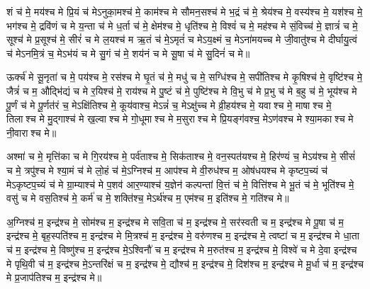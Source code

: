 शं च॑ मे॒ मय॑श्च मे प्रि॒यं च॑ मेऽनुका॒मश्च॑ मे॒ काम॑श्च मे सौमन॒सश्च॑ मे भ॒द्रं च॑ मे॒ श्रेय॑श्च मे॒ वस्य॑श्च मे॒ यश॑श्च मे॒ भग॑श्च मे॒ द्रवि॑णं च मे य॒न्ता च॑ मे ध॒र्ता च॑ मे॒ क्षेम॑श्च मे॒ धृति॑श्च मे॒ विश्वं॑ च मे॒ मह॑श्च मे सं॒विच्च॑ मे॒ ज्ञात्रं॑ च मे॒ सूश्च॑ मे प्र॒सूश्च॑ मे॒ सीरं॑ च मे ल॒यश्च॑ म ऋ॒तं च॑ मे॒ऽमृतं॑ च मेऽय॒क्ष्मं च॒ मेऽना॑मयच्च मे जी॒वातु॑श्च मे दीर्घायु॒त्वं च॑ मेऽनमि॒त्रं च॒ मेऽभ॑यं च मे सु॒गं च॑ मे॒ शय॑नं च मे सू॒षा च॑ मे सु॒दिनं॑ च मे॥


ऊर्क्च॑ मे सू॒नृता॑ च मे॒ पय॑श्च मे॒ रस॑श्च मे घृ॒तं च॑ मे॒ मधु॑ च मे॒ सग्धि॑श्च मे॒ सपी॑तिश्च मे कृ॒षिश्च॑ मे॒ वृष्टि॑श्च मे॒ जैत्रं॑ च म॒ औद्भि॑द्यं च मे र॒यिश्च॑ मे॒ राय॑श्च मे पु॒ष्टं च॑ मे॒ पुष्टि॑श्च मे वि॒भु च॑ मे प्र॒भु च॑ मे ब॒हु च॑ मे॒ भूय॑श्च मे पू॒र्णं च॑ मे पू॒र्णत॑रं च॒ मेऽक्षि॑तिश्च मे॒ कूय॑वाश्च॒ मेऽन्नं॑ च॒ मेऽक्षु॑च्च मे व्री॒हय॑श्च मे॒ यवाश्च मे॒ माषाश्च मे॒ तिलाश्च मे मु॒द्गाश्च॑ मे ख॒ल्वाश्च मे गो॒धूमाश्च मे म॒सुराश्च मे प्रि॒यङ्ग॑वश्च॒ मेऽण॑वश्च मे श्या॒मकाश्च मे नी॒वाराश्च मे॥ 


अश्मा॑ च मे॒ मृत्ति॑का च मे गि॒रय॑श्च मे॒ पर्व॑ताश्च मे॒ सिक॑ताश्च मे॒ वन॒स्पत॑यश्च मे॒ हिर॑ण्यं च॒ मेऽय॑श्च मे॒ सीसं॑ च मे॒ त्रपु॑श्च मे श्या॒मं च॑ मे लो॒हं च॑ मे॒ऽग्निश्च॑ म॒ आप॑श्च मे वी॒रुध॑श्च म॒ ओष॑धयश्च मे कृष्टप॒च्यं च॑ मेऽकृष्टप॒च्यं च॑ मे ग्रा॒म्याश्च॑ मे प॒शव॑ आर॒ण्याश्च॑ य॒ज्ञेन॑ कल्पन्तां वि॒त्तं च॑ मे॒ वित्ति॑श्च मे भू॒तं च॑ मे॒ भूति॑श्च मे॒ वसु॑ च मे वस॒तिश्च॑ मे॒ कर्म॑ च मे॒ शक्ति॑श्च॒ मेऽर्थ॑श्च म॒ एम॑श्च म॒ इति॑श्च मे॒ गति॑श्च मे॥


अ॒ग्निश्च॑ म॒ इन्द्र॑श्च मे॒ सोम॑श्च म॒ इन्द्र॑श्च मे सवि॒ता च॑ म॒ इन्द्र॑श्च मे॒ सर॑स्वती च म॒ इन्द्र॑श्च मे पू॒षा च॑ म॒ इन्द्र॑श्च मे॒ बृह॒स्पति॑श्च म॒ इन्द्र॑श्च मे मि॒त्रश्च॑ म॒ इन्द्र॑श्च मे॒ वरु॑णश्च म॒ इन्द्र॑श्च मे॒ त्वष्टा॑ च म॒ इन्द्र॑श्च मे धा॒ता च॑ म॒ इन्द्र॑श्च मे॒ विष्णु॑श्च म॒ इन्द्र॑श्च मे॒ऽश्विनौ॑ च म॒ इन्द्र॑श्च मे म॒रुत॑श्च म॒ इन्द्र॑श्च मे॒ विश्वे॑ च मे दे॒वा इन्द्र॑श्च मे पृथि॒वी च॑ म॒ इन्द्र॑श्च मे॒ऽन्तरि॑क्षं च म॒ इन्द्र॑श्च मे॒ द्यौश्च॑ म॒ इन्द्र॑श्च मे॒ दिश॑श्च म॒ इन्द्र॑श्च मे मू॒र्धा च॑ म॒ इन्द्र॑श्च मे प्र॒जाप॑तिश्च म॒ इन्द्र॑श्च मे॥

